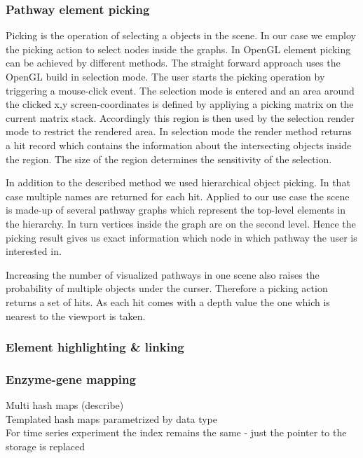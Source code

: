 \subsubsection{Pathway element picking}

Picking is the operation of selecting a objects in the scene. In our case we employ the picking action to select nodes inside the graphs. In OpenGL element picking can be achieved by different methods. The straight forward approach uses the OpenGL build in selection mode\cite{Shreiner2005}. The user starts the picking operation by triggering a mouse-click event. The selection mode is entered and an area around the clicked x,y screen-coordinates is defined by appliying a picking matrix on the current matrix stack. Accordingly this region is then used by the selection render mode to restrict the rendered area. In selection mode the render method returns a hit record which contains the information about the intersecting objects inside the region. The size of the region determines the sensitivity of the selection.  

In addition to the described method we used hierarchical object picking. In that case multiple names are returned for each hit. Applied to our use case the scene is made-up of several pathway graphs which represent the top-level elements in the hierarchy. In turn vertices inside the graph are on the second level. Hence the picking result gives us exact information which node in which pathway the user is interested in.

Increasing the number of visualized pathways in one scene also raises the probability of multiple objects under the curser. Therefore a picking action returns a set of hits. As each hit comes with a depth value the one which is nearest to the viewport is taken.

\subsubsection{Element highlighting \& linking}

\subsubsection{Enzyme-gene mapping}

Multi hash maps (describe)\\
Templated hash maps parametrized by data type\\
For time series experiment the index remains the same - just the pointer to the storage is replaced\\